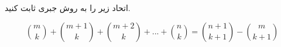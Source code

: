 \exercise
اتحاد زیر را به روش جبری ثابت کنید.

$$\binom{m}{k} + \binom{m+1}{k} + \binom{m+2}{k} + ... + \binom{n}{k} = \binom{n+1}{k+1} - \binom{m}{k+1}$$